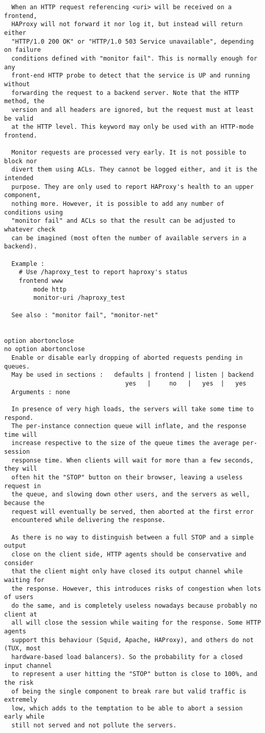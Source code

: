 \begin{verbatim}
  When an HTTP request referencing <uri> will be received on a frontend,
  HAProxy will not forward it nor log it, but instead will return either
  "HTTP/1.0 200 OK" or "HTTP/1.0 503 Service unavailable", depending on failure
  conditions defined with "monitor fail". This is normally enough for any
  front-end HTTP probe to detect that the service is UP and running without
  forwarding the request to a backend server. Note that the HTTP method, the
  version and all headers are ignored, but the request must at least be valid
  at the HTTP level. This keyword may only be used with an HTTP-mode frontend.

  Monitor requests are processed very early. It is not possible to block nor
  divert them using ACLs. They cannot be logged either, and it is the intended
  purpose. They are only used to report HAProxy's health to an upper component,
  nothing more. However, it is possible to add any number of conditions using
  "monitor fail" and ACLs so that the result can be adjusted to whatever check
  can be imagined (most often the number of available servers in a backend).

  Example :
    # Use /haproxy_test to report haproxy's status
    frontend www
        mode http
        monitor-uri /haproxy_test

  See also : "monitor fail", "monitor-net"


option abortonclose
no option abortonclose
  Enable or disable early dropping of aborted requests pending in queues.
  May be used in sections :   defaults | frontend | listen | backend
                                 yes   |     no   |   yes  |   yes
  Arguments : none

  In presence of very high loads, the servers will take some time to respond.
  The per-instance connection queue will inflate, and the response time will
  increase respective to the size of the queue times the average per-session
  response time. When clients will wait for more than a few seconds, they will
  often hit the "STOP" button on their browser, leaving a useless request in
  the queue, and slowing down other users, and the servers as well, because the
  request will eventually be served, then aborted at the first error
  encountered while delivering the response.

  As there is no way to distinguish between a full STOP and a simple output
  close on the client side, HTTP agents should be conservative and consider
  that the client might only have closed its output channel while waiting for
  the response. However, this introduces risks of congestion when lots of users
  do the same, and is completely useless nowadays because probably no client at
  all will close the session while waiting for the response. Some HTTP agents
  support this behaviour (Squid, Apache, HAProxy), and others do not (TUX, most
  hardware-based load balancers). So the probability for a closed input channel
  to represent a user hitting the "STOP" button is close to 100%, and the risk
  of being the single component to break rare but valid traffic is extremely
  low, which adds to the temptation to be able to abort a session early while
  still not served and not pollute the servers.


\end{verbatim}
